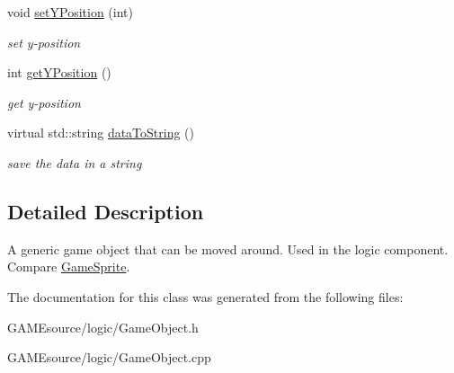 \begin{DoxyCompactItemize}
\mbox{\label{class_game_object_a09913a2ffb23b697a0d79bf1145c0f01}} 
void \mbox{\hyperlink{class_game_object_a09913a2ffb23b697a0d79bf1145c0f01}{set\+Y\+Position}} (int)
\begin{DoxyCompactList}\small\item\em set y-\/position \end{DoxyCompactList}\item 
\mbox{\label{class_game_object_a2c986fbc8dc62a1c187466a4ab48bebd}} 
int \mbox{\hyperlink{class_game_object_a2c986fbc8dc62a1c187466a4ab48bebd}{get\+Y\+Position}} ()
\begin{DoxyCompactList}\small\item\em get y-\/position \end{DoxyCompactList}\item 
\mbox{\label{class_game_object_af9bc07709ad106c507cccdef63d86254}} 
virtual std\+::string \mbox{\hyperlink{class_game_object_af9bc07709ad106c507cccdef63d86254}{data\+To\+String}} ()
\begin{DoxyCompactList}\small\item\em save the data in a string \end{DoxyCompactList}\end{DoxyCompactItemize}


\subsection{Detailed Description}
A generic game object that can be moved around. Used in the logic component. Compare \mbox{\hyperlink{class_game_sprite}{Game\+Sprite}}. 

The documentation for this class was generated from the following files\+:\begin{DoxyCompactItemize}
\item 
G\+A\+M\+Esource/logic/Game\+Object.\+h\item 
G\+A\+M\+Esource/logic/Game\+Object.\+cpp\end{DoxyCompactItemize}
